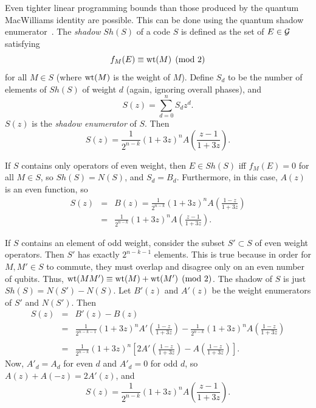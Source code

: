 \documentclass{report}
\newcommand{\G}{{\cal G}}
\newcommand{\Sum}{\sum}
\begin{document}
Even tighter linear programming bounds than those produced by the 
quantum MacWilliams identity are possible.  This can be done using the 
quantum shadow enumerator~\cite{rains-shadow}.  The {\em shadow} $Sh(S)$ of 
a code $S$ is defined as the set of $E \in \G$ satisfying
\begin{equation}
f_M (E) \equiv {\rm wt} (M) \pmod{2}
\end{equation}
for all $M \in S$ (where ${\rm wt} (M)$ is the weight of $M$).  Define 
$S_d$ to be the number of elements of $Sh(S)$ of weight $d$ (again, ignoring
overall phases), and
\begin{equation}
S (z) = \Sum_{d=0}^{n} S_d z^d.
\end{equation}
$S(z)$ is the {\em shadow enumerator} of $S$.  Then
\begin{equation}
S(z) = \frac{1}{2^{n-k}} (1+3z)^n A \left( \frac{z-1}{1+3z} \right).
\label{eq-shadow}
\end{equation}

If $S$ contains only operators of even weight, then $E \in Sh(S)$ iff $f_M (E) 
= 0$ for all $M \in S$, so $Sh(S) = N(S)$, and $S_d = B_d$.  Furthermore, in 
this case, $A(z)$ is an even function, so
\begin{eqnarray}
S(z) & = & B(z) = \frac{1}{2^{n-k}} (1+3z)^n A \left( \frac{1-z}{1+3z} \right) 
\\
& = & \frac{1}{2^{n-k}} (1+3z)^n A \left( \frac{z-1}{1+3z} \right).
\end{eqnarray}

If $S$ contains an element of odd weight, consider the subset $S' \subset 
S$ of even weight operators.  Then $S'$ has exactly $2^{n-k-1}$ elements.  
This is true because in order for $M, M' \in S$ to commute, they must overlap
and disagree only on an even number of qubits.  Thus, ${\rm wt}(MM') \equiv
{\rm wt}(M) + {\rm wt}(M') \pmod{2}$.
The shadow of $S$ is just $Sh(S) = N(S') - N(S)$.  Let $B'(z)$ and $A'(z)$ be 
the weight enumerators of $S'$ and $N(S')$.  Then
\begin{eqnarray}
S(z) & = & B' (z) - B(z) \\
& = & \frac{1}{2^{n-k-1}} (1+3z)^n A' \left( \frac{1-z}{1+3z} \right) - 
\frac{1}{2^{n-k}} (1+3z)^n A \left( \frac{1-z}{1+3z} \right) \nonumber \\ \\
& = & \frac{1}{2^{n-k}} (1+3z)^n \left[ 2 A' \left( \frac{1-z}{1+3z} \right) - 
A \left( \frac{1-z}{1+3z} \right) \right].
\end{eqnarray}
Now, $A'_d = A_d$ for even $d$ and $A'_d = 0$ for odd $d$, so $A(z) + A(-
z) = 2 A'(z)$, and
\begin{equation}
S(z) = \frac{1}{2^{n-k}} (1+3z)^n A \left( \frac{z-1}{1+3z} \right).
\end{equation}
\end{document}
